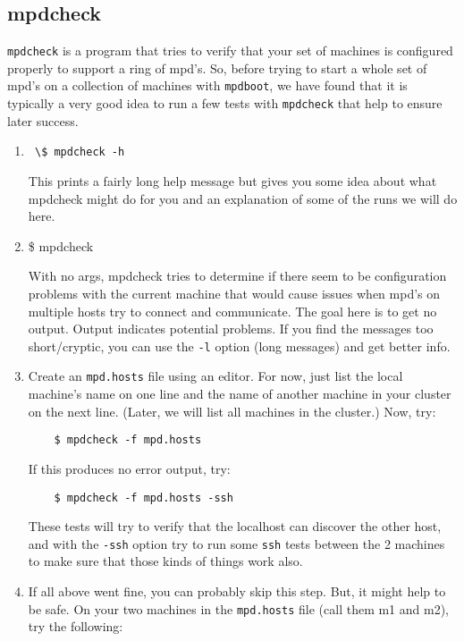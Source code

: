 \documentclass[dvipdfm,11pt]{article}
\begin{document}
\subsection{mpdcheck}
\label{sec:mpdcheck}

\texttt{mpdcheck} is a program that tries to verify that your set of
machines is configured properly to support a ring of mpd's.
So, before trying to start a whole set of mpd's on a collection of
machines with \texttt{mpdboot}, we have found that it is typically a
very good idea to run a few tests with \texttt{mpdcheck} that help to ensure
later success.

\begin{enumerate}
\item \verb+ \$ mpdcheck -h +

This prints a fairly long help message but gives you some
idea about what mpdcheck might do for you and an
explanation of some of the runs we will do here.

\item \$ mpdcheck

With no args, mpdcheck tries to determine if there seem to
be configuration problems with the current machine that
would cause issues when mpd's on multiple hosts try to
connect and communicate.  The goal here is to get no
output.  Output indicates potential problems.  If you find
the messages too short/cryptic, you can use the \texttt{-l} option
(long messages) and get better info.

\item Create an \texttt{mpd.hosts} file using an editor.  For now, just
    list the local machine's name on one line and the name of
    another machine in your cluster on the next line.  (Later,
    we will list all machines in the cluster.)  Now, try:
\begin{verbatim}
    $ mpdcheck -f mpd.hosts
\end{verbatim}
    If this produces no error output, try:
\begin{verbatim}
    $ mpdcheck -f mpd.hosts -ssh
\end{verbatim}
These tests will try to verify that the localhost can
discover the other host, and with the \texttt{-ssh} option try to
run some \texttt{ssh} tests between the 2 machines to make sure
that those kinds of things work also.

\item If all above went fine, you can probably skip this step.
But, it might help to be safe.  On your two machines in
the \texttt{mpd.hosts} file (call them m1 and m2), try the following:


\end{enumerate}
\end{document}

